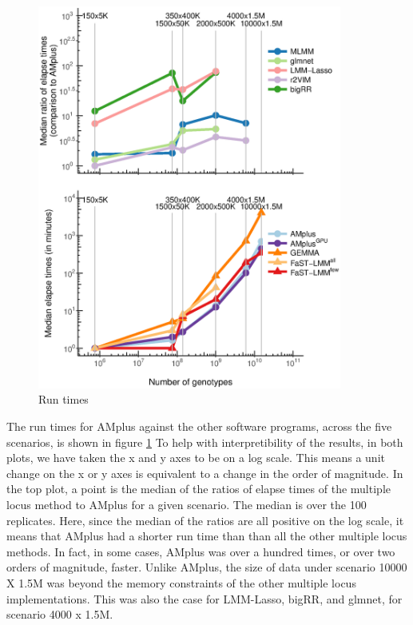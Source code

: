 \documentclass[12pt]{article}
\begin{document}
\begin{figure}
\label{fig_runtimes}
\caption{Run times}
\includegraphics[width=10cm]{time}
\end{figure}


The run times for AMplus against the other software programs, across the five scenarios, is shown in figure \ref{fig_runtimes} To help with interpretibility of the results, in both plots, we have taken the x and y axes to be on a log scale. This means a unit change on the x or y axes is equivalent to a change in the order of magnitude. 
In the top plot, a point is the median of the ratios of elapse times of the multiple locus method to AMplus for a given scenario. The median is over the 100 replicates. Here, since the median of the ratios are all positive on the log scale, it means that AMplus had a shorter run time than than all the other multiple locus methods. In fact, in some cases, AMplus was over a hundred times, or over two orders of magnitude, faster. Unlike AMplus, the size of data under scenario 10000 X 1.5M was beyond the memory constraints of the other multiple locus implementations. This was also the case for LMM-Lasso, bigRR, and glmnet, for scenario 4000 x 1.5M.
\end{document}
